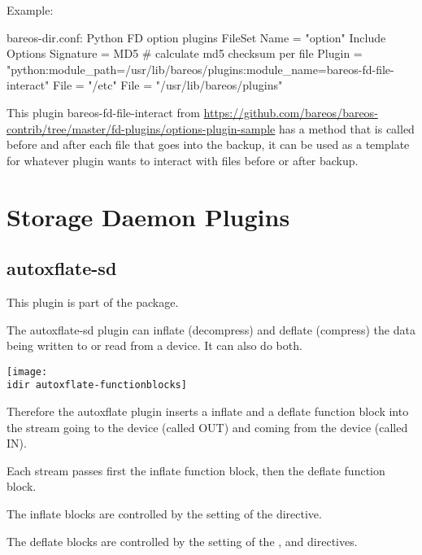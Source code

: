 Example:

\begin{bconfig}{bareos-dir.conf: Python FD option plugins}
FileSet {
  Name = "option"
  Include {
    Options {
      Signature = MD5 # calculate md5 checksum per file
      Plugin = "python:module_path=/usr/lib/bareos/plugins:module_name=bareos-fd-file-interact"
    }
    File = "/etc"
    File = "/usr/lib/bareos/plugins"
  }
}
\end{bconfig}

This plugin bareos-fd-file-interact from \url{https://github.com/bareos/bareos-contrib/tree/master/fd-plugins/options-plugin-sample} has a method that is called before and after each file that goes into the backup,
it can be used as a template for whatever plugin wants to interact with files before or after backup.

\section{Storage Daemon Plugins}
\label{sdPlugins}

\subsection{autoxflate-sd}
\label{plugin-autoxflate-sd}


This plugin is part of the  package.

The autoxflate-sd plugin can inflate (decompress) and deflate (compress)
the data being written to or read from a device. It can also do both.

\begin{center}
\texttt{[image: \\idir autoxflate-functionblocks]}
\end{center}

Therefore the autoxflate plugin inserts a inflate and a deflate function block
into the stream going to the device (called OUT) and coming from the device (called IN).

Each stream passes first the inflate function block, then the deflate function block.

The inflate blocks are controlled by the setting of the  directive.

The deflate blocks are controlled by the setting of the ,
 and  directives.

